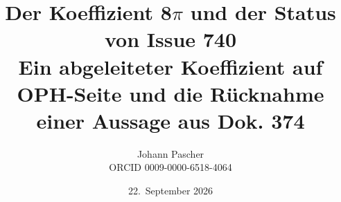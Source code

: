 \documentclass[11pt,a4paper]{report}
\title{Der Koeffizient 8$\pi$ und der Status von Issue 740\\[0.5em]\large Ein abgeleiteter Koeffizient auf OPH-Seite und die Rücknahme einer Aussage aus Dok. 374}
\date{22.~September 2026}
\author{Johann Pascher\\\small ORCID 0009-0000-6518-4064}
\begin{document}
\renewcommand{\thechapter}{}
\renewcommand{\thesection}{\arabic{section}}
\maketitle
\tableofcontents

\end{document}
